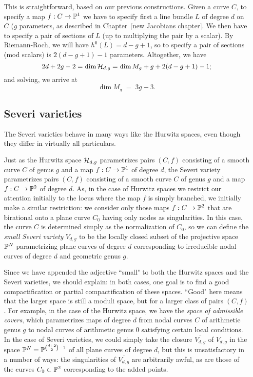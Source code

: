 This is straightforward, based on our previous constructions. Given a curve $C$, to specify a map $f : C \to {\mathbb P}^1$ we have to specify first a line bundle $L$ of degree $d$ on $C$ ($g$ parameters, as described in Chapter~\ref{new Jacobians chapter}. We then have to specify a pair of sections of $L$ (up to multiplying the pair by a scalar). By Riemann-Roch, we will have $h^0(L) = d-g+1$, so to specify a pair of sections (mod scalars) is $2(d-g+1)-1$ parameters. Altogether, we have
$$
2d+2g-2 = \dim {\cal H}_{d,g} = \dim M_g + g + 2(d-g+1)-1;
$$
and solving, we arrive at
$$
\dim M_g \; = \; 3g-3.
$$




\subsection{Severi varieties}

The Severi varieties behave in many ways like the Hurwitz spaces, even though they differ in virtually all particulars.

Just as the Hurwitz space ${\cal H}_{d,g}$ parametrizes pairs $(C,f)$ consisting of a smooth curve $C$ of genus $g$ and a map $f : C \to {\mathbb P}^1$ of degree $d$, the Severi variety parametrizes pairs $(C,f)$ consisting of a smooth curve $C$ of genus $g$ and a map $f : C \to {\mathbb P}^2$ of degree $d$. As, in the case of Hurwitz spaces we restrict our attention initially to the locus where the map $f$ is simply branched, we initially make a similar restriction: we consider only those maps $f : C \to {\mathbb P}^2$ that are birational onto a plane curve $C_0$ having only nodes as singularities. In this case, the curve $C$ is determined simply as the normalization of $C_0$, so we can define the \emph{small Severi variety} $V_{d,g}$ to be the locally closed subset of the projective space ${\mathbb P}^N$ parametrizing plane curves of degree $d$ corresponding to irreducible nodal curves of degree $d$ and geometric genus $g$.

Since we have appended the adjective ``small" to both the Hurwitz spaces and the Severi varieties, we should explain: in both cases, one goal is to find a good compactification or partial compactification of these spaces. ``Good" here means that the larger space is still a moduli space, but for a larger class of pairs $(C,f)$. For example, in the case of the Hurwitz space, we have the \emph{space of admissible covers}, which parametrizes  maps of degree $d$ from nodal curves $C$ of arithmetic genus $g$ to nodal curves of arithmetic genus 0 satisfying certain local conditions. In the case of Severi varieties, we could simply take the closure $\overline{V_{d,g}}$ of $V_{d,g}$ in the space ${\mathbb P}^N = {\mathbb P}^{\binom{d+2}{2}-1}$ of all plane curves of degree $d$, but this is unsatisfactory in a number of ways: the singularities of $\overline{V_{d,g}}$ are arbitrarily awful, as are those of the curves $C_0 \subset {\mathbb P}^2$ corresponding to the added points.

